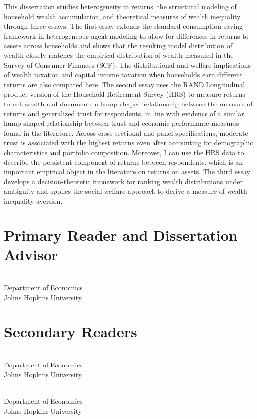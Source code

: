 
This dissertation studies heterogeneity in returns, the structural modeling of
household wealth accumulation, and theoretical measures of wealth inequality
through three essays. The first essay extends the standard consumption-saving
framework in heterogeneous-agent modeling to allow for differences in returns to
assets across households and shows that the resulting model distribution of
wealth closely matches the empirical distribution of wealth measured in the
Survey of Consumer Finances (SCF). The distributional and welfare implications
of wealth taxation and capital income taxation when households earn different
returns are also compared here. The second essay uses the RAND Longitudinal
product version of the Household Retirement Survey (HRS) to measure returns to
net wealth and documents a hump-shaped relationship between the measure of
returns and generalized trust for respondents, in line with evidence of a
similar hump-shaped relationship between trust and economic performance measures
found in the literature. Across cross-sectional and panel specifications,
moderate trust is associated with the highest returns even after accounting for
demographic characteristics and portfolio composition. Moreover, I can use the
HRS data to describe the persistent component of returns between respondents,
which is an important empirical object in the literature on returns on assets.
The third essay develops a decision-theoretic framework for ranking wealth
distributions under ambiguity and applies the social welfare approach to derive
a measure of wealth inequality aversion.

\keywords{\DissertationKeywords}

\begin{singlespace}
\section*{Primary Reader and Dissertation Advisor}
\PrimaryReader \\
Department of Economics \\
Johns Hopkins University

\section*{Secondary Readers}
\SecondaryReaderOne \\
Department of Economics \\
Johns Hopkins University

\vspace{0.1in}

\SecondaryReaderTwo \\
Department of Economics \\
Johns Hopkins University
\end{singlespace}
